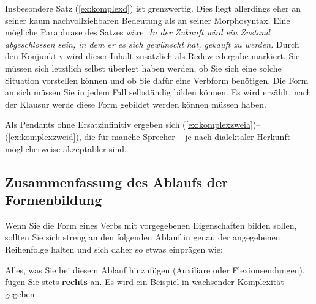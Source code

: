 Insbesondere Satz (\ref{ex:komplexd}) ist grenzwertig.
Dies liegt allerdings eher an seiner kaum nachvollziehbaren Bedeutung als an seiner Morphosyntax.
Eine mögliche Paraphrase des Satzes wäre:
\textit{In der Zukunft wird ein Zustand abgeschlossen sein, in dem er es sich gewünscht hat, gekauft zu werden.}
Durch den Konjunktiv wird dieser Inhalt zusätzlich als Redewiedergabe markiert.
Sie müssen sich letztlich selbst überlegt haben werden, ob Sie sich eine solche Situation vorstellen können und ob Sie dafür eine Verbform benötigen.
Die Form an sich müssen Sie in jedem Fall selbständig bilden können.
Es wird erzählt, nach der Klausur werde diese Form gebildet werden können müssen haben.

Als Pendants ohne Ersatzinfinitiv ergeben sich (\ref{ex:komplexzweia})--(\ref{ex:komplexzweid}), die für manche Sprecher -- je nach dialektaler Herkunft -- möglicherweise akzeptabler sind.

\begin{exe}
\end{exe}

\subsection{Zusammenfassung des Ablaufs der Formenbildung}

Wenn Sie die Form eines Verbs mit vorgegebenen Eigenschaften bilden sollen, sollten Sie sich streng an den folgenden Ablauf in genau der angegebenen Reihenfolge halten und sich daher so etwas einprägen wie:

\begin{quote}
\end{quote}

Alles, was Sie bei diesem Ablauf hinzufügen (Auxiliare oder Flexionsendungen), fügen Sie stets \textbf{rechts} an.
Es wird ein Beispiel in wachsender Komplexität gegeben.

